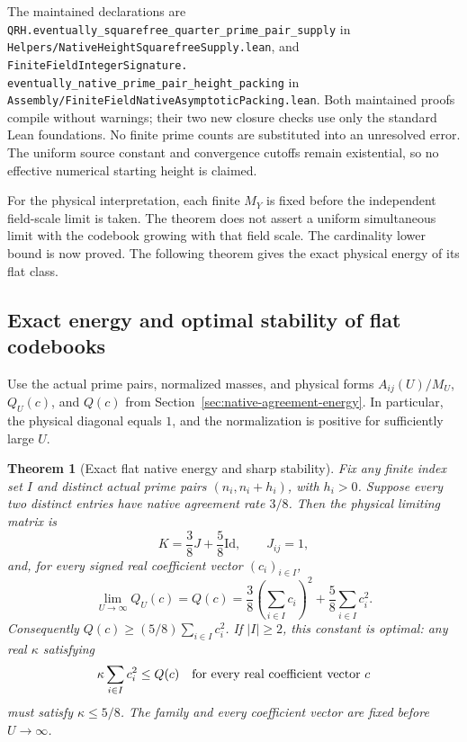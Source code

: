 \documentclass[11pt]{article}
\newtheorem{theorem}{Theorem}[section]
\begin{document}
The maintained declarations are
\texttt{QRH.eventually\_squarefree\_quarter\_prime\_pair\_supply}
in \texttt{Helpers/\allowbreak NativeHeightSquarefreeSupply.\allowbreak lean}, and
\texttt{FiniteFieldIntegerSignature.\allowbreak
eventually\_native\_prime\_pair\_height\_packing}
in \texttt{Assembly/\allowbreak FiniteFieldNativeAsymptoticPacking.\allowbreak lean}.
Both maintained proofs compile without warnings; their two new closure
checks use only the standard Lean foundations.
No finite prime counts are substituted into an unresolved error.
The uniform source constant and convergence cutoffs remain existential,
so no effective numerical starting height is claimed.

For the physical interpretation, each finite \(M_Y\) is fixed before
the independent field-scale limit is taken. The theorem does not assert
a uniform simultaneous limit with the codebook growing with that field
scale. The cardinality lower bound is now proved. The following theorem
gives the exact physical energy of its flat class.

\subsection{Exact energy and optimal stability of flat codebooks}

Use the actual prime pairs, normalized masses, and physical forms
\(A_{ij}(U)/M_U\), \(Q_U(c)\), and \(Q(c)\) from
Section~\ref{sec:native-agreement-energy}. In particular, the physical
diagonal equals \(1\), and the normalization is positive for
sufficiently large \(U\).

\begin{theorem}[Exact flat native energy and sharp stability]
\label{thm:native-flat-energy}
Fix any finite index set \(I\) and distinct actual prime pairs
\((n_i,n_i+h_i)\), with \(h_i>0\). Suppose every two distinct
entries have native agreement rate \(3/8\). Then the physical
limiting matrix is
\[
 K=\frac38J+\frac58\mathrm{Id},\qquad J_{ij}=1,
\]
and, for every signed real coefficient vector \((c_i)_{i\in I}\),
\[
 \lim_{U\to\infty}Q_U(c)=Q(c)
    =\frac38\left(\sum_{i\in I}c_i\right)^2
       +\frac58\sum_{i\in I}c_i^2.
\]
Consequently \(Q(c)\ge(5/8)\sum_{i\in I}c_i^2\).
If \(|I|\ge2\), this constant is optimal: any real \(\kappa\)
satisfying
\[
 \kappa\sum_{i\in I}c_i^2\le Q(c)
       \quad\hbox{for every real coefficient vector }c
\]
must satisfy \(\kappa\le5/8\).
The family and every coefficient vector are fixed before \(U\to\infty\).
\end{theorem}
\end{document}
